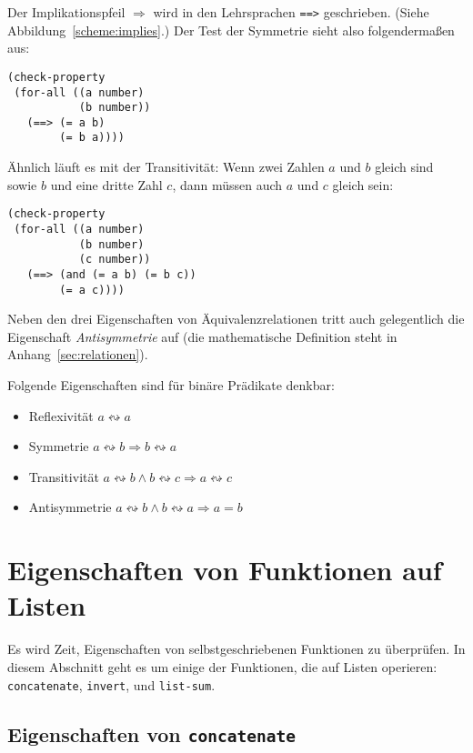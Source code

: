 Der Implikationspfeil $\Rightarrow$ wird in den Lehrsprachen
\lstinline{==>} geschrieben.  (Siehe
Abbildung~\ref{scheme:implies}.)  Der Test der
Symmetrie sieht also folgendermaßen aus:
%
\begin{lstlisting}
(check-property
 (for-all ((a number)
           (b number))
   (==> (= a b)
        (= b a))))
\end{lstlisting}
%
Ähnlich läuft es mit der Transitivität: Wenn zwei Zahlen $a$ und $b$
gleich sind sowie $b$ und eine dritte Zahl $c$, dann müssen auch $a$
und $c$ gleich sein:
%
\begin{lstlisting}
(check-property
 (for-all ((a number)
           (b number)
           (c number))
   (==> (and (= a b) (= b c))
        (= a c))))
\end{lstlisting}
%
Neben den drei Eigenschaften von Äquivalenzrelationen tritt auch
gelegentlich die Eigenschaft
\textit{Antisymmetrie} auf (die mathematische
Definition steht in Anhang~\ref{sec:relationen}).

\begin{mantra}
%
Folgende Eigenschaften sind für binäre Prädikate denkbar:
\begin{itemize}
\item Reflexivität $a \leftrightsquigarrow a$
\item Symmetrie $a \leftrightsquigarrow b \Rightarrow b \leftrightsquigarrow a$
\item Transitivität $a \leftrightsquigarrow b \wedge b
  \leftrightsquigarrow c
  \Rightarrow a \leftrightsquigarrow c$
\item Antisymmetrie $a \leftrightsquigarrow b \wedge  b
  \leftrightsquigarrow a \Rightarrow a = b$
\end{itemize}
\end{mantra}

\section{Eigenschaften von Funktionen auf Listen}

Es wird Zeit, Eigenschaften von selbstgeschriebenen Funktionen zu
überprüfen.  In diesem Abschnitt geht es um einige der Funktionen, die
auf Listen operieren: \lstinline{concatenate}, \lstinline{invert},
und \lstinline{list-sum}.

\subsection{Eigenschaften von \lstinline{concatenate}}


